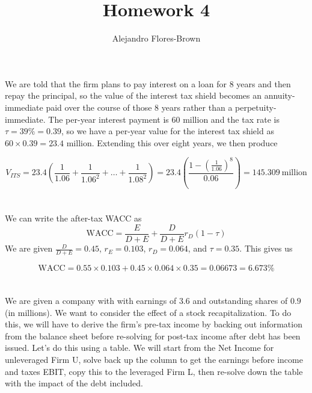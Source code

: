 \documentclass[12pt, letterpaper, parskip = full]{article}
\title{Homework 4}
\author{Alejandro Flores-Brown}
\begin{document}
	\maketitle

	\section{}

	We are told that the firm plans to pay interest on a loan for \(8\) years and then repay the principal, so the value of the interest tax shield becomes an annuity-immediate paid over the course of those \(8\) years rather than a perpetuity-immediate. The per-year interest payment is \(60\) million and the tax rate is \(\tau = 39\% = 0.39\), so we have a per-year value for the interest tax shield as \(60 \times 0.39 = 23.4\) million. Extending this over eight years, we then produce

	\[ V_{ITS} = 23.4 \left(\frac{1}{1.06} + \frac{1}{1.06^2} + \dots + \frac{1}{1.08^2}\right) = 23.4 \left( \frac{1 - \left( \frac{1}{1.06} \right)^8}{0.06} \right) = 145.309\ \text{million}    \]

	\section{}

	We can write the after-tax WACC as 
	\[ \text{WACC} = \frac{E}{D+E} + \frac{D}{D+E} r_D (1 - \tau)    \]
	We are given \(\frac{D}{D+E} = 0.45\), \(r_E = 0.103\), \(r_D = 0.064\), and \(\tau = 0.35\). This gives us

	\[ \text{WACC} = 0.55 \times 0.103 + 0.45 \times 0.064 \times 0.35 = 0.06673 = 6.673\%   \]

	\section{}

	We are given a company with with earnings of \(3.6\) and outstanding shares of \(0.9\) (in millions). We want to consider the effect of a stock recapitalization. To do this, we will have to derive the firm's pre-tax income by backing out information from the balance sheet before re-solving for post-tax income after debt has been issued. Let's do this using a table. We will start from the Net Income for unleveraged Firm U, solve back up the column to get the earnings before income and taxes EBIT, copy this to the leveraged Firm L, then re-solve down the table with the impact of the debt included.
\end{document}
